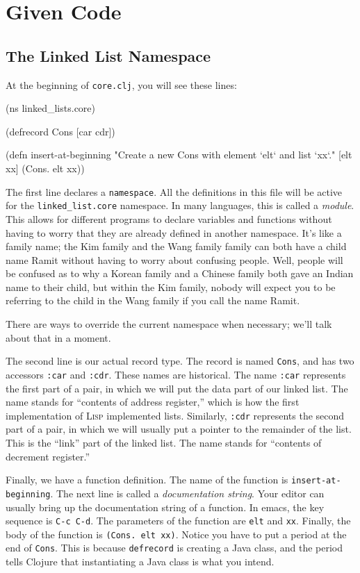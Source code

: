 \documentclass[12pt]{article}
\begin{document}
\section{Given Code}

\subsection{The Linked List Namespace}

At the beginning of \texttt{core.clj}, you will see these lines:

\begin{clojurecode}
(ns linked_lists.core)

(defrecord Cons [car cdr])

(defn insert-at-beginning 
  "Create a new Cons with element `elt` and list `xx`."
  [elt xx]
  (Cons. elt xx))
\end{clojurecode}

The first line declares a \texttt{namespace}.  All the definitions in this file will be active for
the \texttt{linked\_list.core} namespace.  In many languages, this is called a \emph{module}.  This
allows for different programs to declare variables and functions without having to worry that they
are already defined in another namespace.  It's like a family name; the Kim family and the Wang
family family can both have a child name Ramit without having to worry about confusing people.
Well, people will be confused as to why a Korean family and a Chinese family both gave an Indian
name to their child, but within the Kim family, nobody will expect you to be referring to the child
in the Wang family if you call the name Ramit.

There are ways to override the current namespace when necessary; we'll talk about that in a moment.

The second line is our actual record type.  The record is named \texttt{Cons}, and has two accessors 
\texttt{:car} and \texttt{:cdr}.  These names are historical.  The name \texttt{:car} represents the
first part of a pair, in which we will put the data part of our linked list.  The name stands for
``contents of address register,'' which is how the first implementation of \textsc{Lisp} implemented
lists.  Similarly, \texttt{:cdr} represents the second part of a pair, in which we will usually put
a pointer to the remainder of the list.  This is the ``link'' part of the linked list.  The name
stands for ``contents of decrement register.''

Finally, we have a function definition.  The name of the function is \texttt{insert-at-beginning}.
The next line is called a \emph{documentation string}.  Your editor can usually bring up the
documentation string of a function.  In emacs, the key sequence is \texttt{C-c C-d}.  The parameters
of the function are \texttt{elt} and \texttt{xx}.  Finally, the body of the function is
\texttt{(Cons. elt xx)}.  Notice you have to put a period at the end of \texttt{Cons}.  This is
because \texttt{defrecord} is creating a Java class, and the period tells Clojure that instantiating
a Java class is what you intend.
\end{document}
